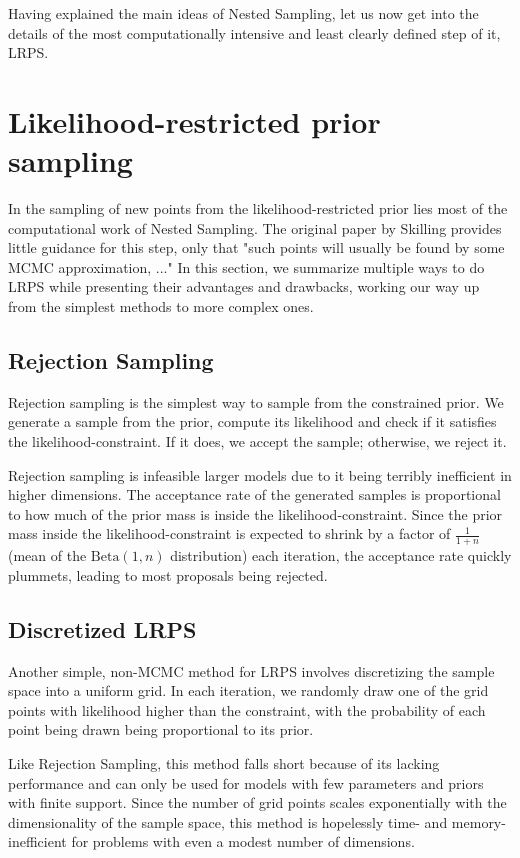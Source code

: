\documentclass[12pt, a4paper]{report}
\begin{document}
Having explained the main ideas of Nested Sampling, let us now get into the details of the most computationally intensive and least clearly defined step of it, LRPS.

\FloatBarrier
\section{Likelihood-restricted prior sampling}
In the sampling of new points from the likelihood-restricted prior lies most of the computational work of Nested Sampling.
The original paper by Skilling provides little guidance for this step, only that "such points will usually be found by some MCMC approximation, ..." \cite[6]{skilling}
In this section, we summarize multiple ways to do LRPS while presenting their advantages and drawbacks, working our way up from the simplest methods to more complex ones.

\subsection{Rejection Sampling}
Rejection sampling is the simplest way to sample from the constrained prior.
We generate a sample from the prior, compute its likelihood and check if it satisfies the likelihood-constraint.
If it does, we accept the sample; otherwise, we reject it.

Rejection sampling is infeasible larger models due to it being terribly inefficient in higher dimensions.
The acceptance rate of the generated samples is proportional to how much of the prior mass is inside the likelihood-constraint.
Since the prior mass inside the likelihood-constraint is expected to shrink by a factor of $\frac{1}{1+n}$ (mean of the $\textrm{Beta}(1, n)$ distribution) each iteration, the acceptance rate quickly plummets, leading to most proposals being rejected.

\subsection{Discretized LRPS}
Another simple, non-MCMC method for LRPS involves discretizing the sample space into a uniform grid.
In each iteration, we randomly draw one of the grid points with likelihood higher than the constraint, with the probability of each point being drawn being proportional to its prior.

Like Rejection Sampling, this method falls short because of its lacking performance and can only be used for models with few parameters and priors with finite support.
Since the number of grid points scales exponentially with the dimensionality of the sample space, this method is hopelessly time- and memory-inefficient for problems with even a modest number of dimensions.
\end{document}
